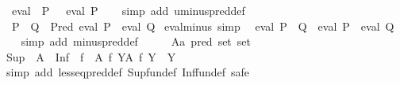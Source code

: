 \begin{isabellebody}
\ \ {\isachardoublequoteopen}eval\ {\isacharparenleft}{\kern0pt}{\isacharminus}{\kern0pt}\ P{\isacharparenright}{\kern0pt}\ {\isacharequal}{\kern0pt}\ {\isacharminus}{\kern0pt}\ eval\ P{\isachardoublequoteclose}\isanewline
%
\isadelimproof
\ \ %
\endisadelimproof
%
\isatagproof
{}\isamarkupfalse%
\ {\isacharparenleft}{\kern0pt}simp\ add{\isacharcolon}{\kern0pt}\ uminus{\isacharunderscore}{\kern0pt}pred{\isacharunderscore}{\kern0pt}def{\isacharparenright}{\kern0pt}%
\endisatagproof
{\isafoldproof}%
%
\isadelimproof
\isanewline
%
\endisadelimproof
\isanewline
{}\isamarkupfalse%
\isanewline
\ \ {\isachardoublequoteopen}P\ {\isacharminus}{\kern0pt}\ Q\ {\isacharequal}{\kern0pt}\ Pred\ {\isacharparenleft}{\kern0pt}eval\ P\ {\isacharminus}{\kern0pt}\ eval\ Q{\isacharparenright}{\kern0pt}{\isachardoublequoteclose}\isanewline
\isanewline
{}\isamarkupfalse%
\ eval{\isacharunderscore}{\kern0pt}minus\ {\isacharbrackleft}{\kern0pt}simp{\isacharbrackright}{\kern0pt}{\isacharcolon}{\kern0pt}\isanewline
\ \ {\isachardoublequoteopen}eval\ {\isacharparenleft}{\kern0pt}P\ {\isacharminus}{\kern0pt}\ Q{\isacharparenright}{\kern0pt}\ {\isacharequal}{\kern0pt}\ eval\ P\ {\isacharminus}{\kern0pt}\ eval\ Q{\isachardoublequoteclose}\isanewline
%
\isadelimproof
\ \ %
\endisadelimproof
%
\isatagproof
{}\isamarkupfalse%
\ {\isacharparenleft}{\kern0pt}simp\ add{\isacharcolon}{\kern0pt}\ minus{\isacharunderscore}{\kern0pt}pred{\isacharunderscore}{\kern0pt}def{\isacharparenright}{\kern0pt}%
\endisatagproof
{\isafoldproof}%
%
\isadelimproof
\isanewline
%
\endisadelimproof
\isanewline
{}\isamarkupfalse%
%
\isadelimproof
\ %
\endisadelimproof
%
\isatagproof
{}\isamarkupfalse%
\isanewline
\ \ \isamarkupfalse%
\ A{\isacharcolon}{\kern0pt}{\isacharcolon}{\kern0pt}{\isachardoublequoteopen}{\isacharprime}{\kern0pt}a\ pred\ set\ set{\isachardoublequoteclose}\isanewline
\ \ \isamarkupfalse%
\ {\isachardoublequoteopen}{\isasymSqinter}{\isacharparenleft}{\kern0pt}Sup\ {\isacharbackquote}{\kern0pt}\ A{\isacharparenright}{\kern0pt}\ {\isasymle}\ {\isasymSqunion}{\isacharparenleft}{\kern0pt}Inf\ {\isacharbackquote}{\kern0pt}\ {\isacharbraceleft}{\kern0pt}f\ {\isacharbackquote}{\kern0pt}\ A\ {\isacharbar}{\kern0pt}f{\isachardot}{\kern0pt}\ {\isasymforall}Y{\isasymin}A{\isachardot}{\kern0pt}\ f\ Y\ {\isasymin}\ Y{\isacharbraceright}{\kern0pt}{\isacharparenright}{\kern0pt}{\isachardoublequoteclose}\isanewline
\ \ \isamarkupfalse%
\ {\isacharparenleft}{\kern0pt}simp\ add{\isacharcolon}{\kern0pt}\ less{\isacharunderscore}{\kern0pt}eq{\isacharunderscore}{\kern0pt}pred{\isacharunderscore}{\kern0pt}def\ Sup{\isacharunderscore}{\kern0pt}fun{\isacharunderscore}{\kern0pt}def\ Inf{\isacharunderscore}{\kern0pt}fun{\isacharunderscore}{\kern0pt}def{\isacharcomma}{\kern0pt}\ safe{\isacharparenright}{\kern0pt}\isanewline

\end{isabellebody}
